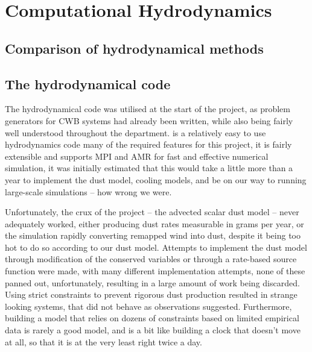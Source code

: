 \section{Computational Hydrodynamics}
\label{sec:hydrodynamics}

\subsection{Comparison of hydrodynamical methods}


\subsection{The \mg{} hydrodynamical code}
\label{sec:mgcode}


The \mg{} hydrodynamical code was utilised at the start of the project, as problem generators for CWB systems had already been written, while also being fairly well understood throughout the department.
\mg{} is a relatively easy to use hydrodynamics code many of the required features for this project, it is fairly extensible and supports MPI and AMR for fast and effective numerical simulation, it was initially estimated that this would take a little more than a year to implement the dust model, cooling models, and be on our way to running large-scale simulations -- how wrong we were.


Unfortunately, the crux of the project -- the advected scalar dust model -- never adequately worked, either producing dust rates measurable in grams per year, or the simulation rapidly converting remapped wind into dust, despite it being too hot to do so according to our dust model.
Attempts to implement the dust model through modification of the conserved variables or through a rate-based source function were made, with many different implementation attempts, none of these panned out, unfortunately, resulting in a large amount of work being discarded.
Using strict constraints to prevent rigorous dust production resulted in strange looking systems, that did not behave as observations suggested.
Furthermore, building a model that relies on dozens of constraints based on limited empirical data is rarely a good model, and is a bit like building a clock that doesn't move at all, so that it is at the very least right twice a day.

